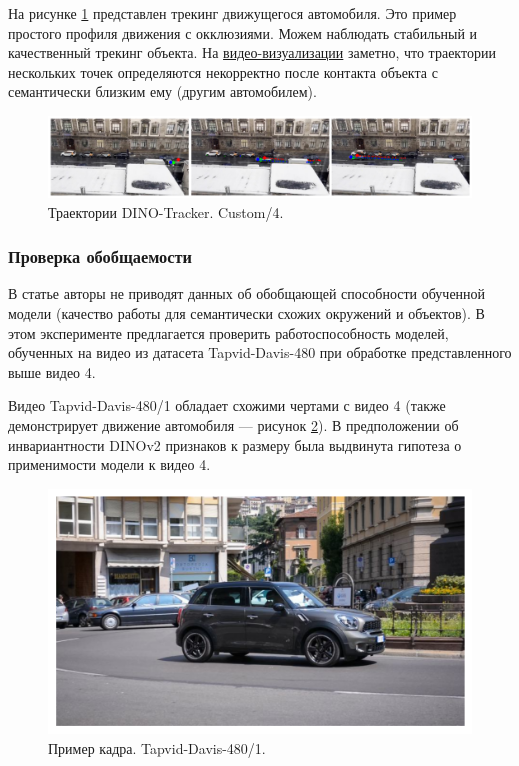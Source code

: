 \documentclass[a4paper, 14pt]{extarticle}
\theoremstyle{definition}
\theoremstyle{plain}
\theoremstyle{remark}
\begin{document}
На рисунке \ref{fig:custom-4} представлен трекинг движущегося автомобиля. Это пример простого профиля движения с окклюзиями. Можем наблюдать стабильный и качественный трекинг объекта. На \href{https://drive.google.com/file/d/1c1rivtgAYqveos9xyPtBjhV8Nz-x64h2/view?usp=drive_link}{видео-визуализации} заметно, что траектории нескольких точек определяются некорректно после контакта объекта с семантически близким ему (другим автомобилем). 
\begin{figure}
    [H]
    \centering
    \includegraphics[width=\textwidth]{figs/custom-4.png}
    \caption{Траектории DINO-Tracker. Custom/4.}
    \label{fig:custom-4}
\end{figure}

\subsubsection{Проверка обобщаемости}
В статье авторы не приводят данных об обобщающей способности обученной модели (качество работы для семантически схожих окружений и объектов). В этом эксперименте предлагается проверить работоспособность моделей, обученных на видео из датасета Tapvid-Davis-480 при обработке представленного выше видео 4.

Видео Tapvid-Davis-480/1 обладает схожими чертами с видео 4 (также демонстрирует движение автомобиля --- рисунок \ref{fig:davis-1-expl}). В предположении об инвариантности DINOv2 признаков к размеру была выдвинута гипотеза о применимости модели к видео 4.
\begin{figure}
    [H]
    \centering
    \includegraphics[width=\textwidth]{figs/davis-1_expl.png}
    \caption{Пример кадра. Tapvid-Davis-480/1.}
    \label{fig:davis-1-expl}
\end{figure}
\end{document}
